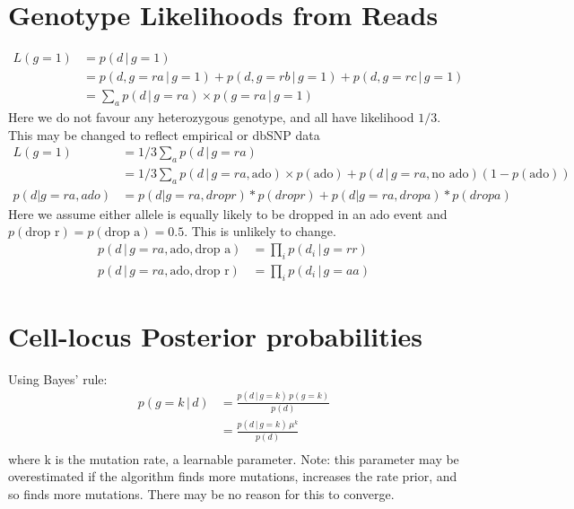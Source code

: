 \documentclass{article}
\begin{document}
\section{Genotype Likelihoods from Reads}
\begin{align*}
L(g=1) &= p(d\,|\,g=1)\\
&=p(d, g=ra \,|\, g=1) + p(d, g=rb \,|\, g=1) + p(d, g=rc \,|\, g=1)\\
&= \sum_a p(d \,|\, g=ra) \times p(g=ra \,|\, g=1)
\end{align*}
Here we do not favour any heterozygous genotype, and all have likelihood $1/3$. This may be changed to reflect empirical or dbSNP data
\begin{align*}
L(g=1) &= 1/3 \sum_a p(d \,|\, g=ra)\\
&= 1/3 \sum_a p(d \,|\, g=ra, \text{ado}) \times p(\text{ado}) + p(d \,|\, g=ra, \text{no ado})(1-p(\text{ado}))\\
p(d|g=ra, ado) &= p(d|g=ra, drop r) * p(drop r) + p(d|g=ra, drop a) * p(drop a)
\end{align*}
Here we assume either allele is equally likely to be dropped in an ado event and $p(\text{drop r}) = p(\text{drop a}) = 0.5$. This is unlikely to change.
\begin{align*}
p(d \,|\, g=ra, \text{ado}, \text{drop a}) &= \prod_i p(d_i \,|\, g=rr)\\
p(d \,|\, g=ra, \text{ado}, \text{drop r}) &= \prod_i p(d_i \,|\, g=aa)
\end{align*}

\section{Cell-locus Posterior probabilities}
Using Bayes' rule:
\begin{align*}
p(g=k\,|\, d) &= \frac{p(d\,|\,g=k)\,p(g=k)}{p(d)}\\
&= \frac{p(d\,|\,g=k)\,\mu^k}{p(d)}\\
\end{align*}
where k is the mutation rate, a learnable parameter. Note: this parameter may be overestimated if the algorithm finds more mutations, increases the rate prior, and so finds more mutations. There may be no reason for this to converge.
\end{document}
